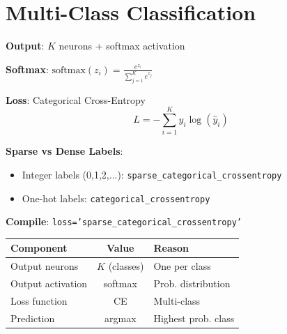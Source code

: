 \documentclass[11pt,a4paper]{article}
\begin{document}
\section{Multi-Class Classification}

\begin{definitionbox}

\textbf{Output}: $K$ neurons + softmax activation

\textbf{Softmax}: $\text{softmax}(z_i) = \frac{e^{z_i}}{\sum_{j=1}^{K} e^{z_j}}$

\textbf{Loss}: Categorical Cross-Entropy
\[L = -\sum_{i=1}^{K} y_i \log(\hat{y}_i)\]

\textbf{Sparse vs Dense Labels}:
\begin{itemize}[leftmargin=*,nosep]
\item Integer labels (0,1,2,...): \texttt{sparse\_categorical\_crossentropy}
\item One-hot labels: \texttt{categorical\_crossentropy}
\end{itemize}
\end{definitionbox}

\begin{examplebox}

\begin{center}
\end{center}
\vspace{-0.5em}
\textbf{Compile}: \texttt{loss='sparse\_categorical\_crossentropy'}
\end{examplebox}

\begin{definitionbox}

\begin{tabular}{@{}l|c|l@{}}
\textbf{Component} & \textbf{Value} & \textbf{Reason} \\
\hline
Output neurons & $K$ (classes) & One per class \\
Output activation & softmax & Prob. distribution \\
Loss function & CE & Multi-class \\
Prediction & argmax & Highest prob. class \\
\end{tabular}
\end{definitionbox}
\end{document}
